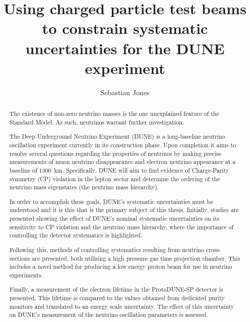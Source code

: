 
\title{Using charged particle test beams to constrain systematic uncertainties for the DUNE experiment}
\author{Sebastian Jones}

\maketitle
\makedeclaration

\begin{abstract} %

The existence of non-zero neutrino masses is the one unexplained feature of the Standard Model.
As such, neutrinos warrant further investigation.

The Deep Underground Neutrino Experiment (DUNE) is a long-baseline neutrino oscillation experiment currently in its construction phase.
Upon completion it aims to resolve several questions regarding the properties of neutrinos by making precise measurements of muon neutrino disappearance and electron neutrino appearance at a baseline of \SI{1300}{\km}.
Specifically, DUNE will aim to find evidence of Charge-Parity symmetry (CP) violation in the lepton sector and determine the ordering of the neutrino mass eigenstates (the neutrino mass hierarchy).

In order to accomplish these goals, DUNE's systematic uncertainties must be understood and it is this that is the primary subject of this thesis.
Initially, studies are presented showing the effect of DUNE's nominal systematic uncertainties on its sensitivity to CP violation and the neutrino mass hierarchy, where the importance of controlling the detector systematics is highlighted. 

Following this, methods of controlling systematics resulting from neutrino cross-sections are presented, both utilising a high pressure gas time projection chamber.
This includes a novel method for producing a low energy proton beam for use in neutrino experiments.

Finally, a measurement of the electron lifetime in the ProtoDUNE-SP detector is presented.
This lifetime is compared to the values obtained from dedicated purity monitors and translated to an energy scale uncertainty.
The effect of this uncertainty on DUNE's measurement of the neutrino oscillation parameters is assessed.

\end{abstract}

